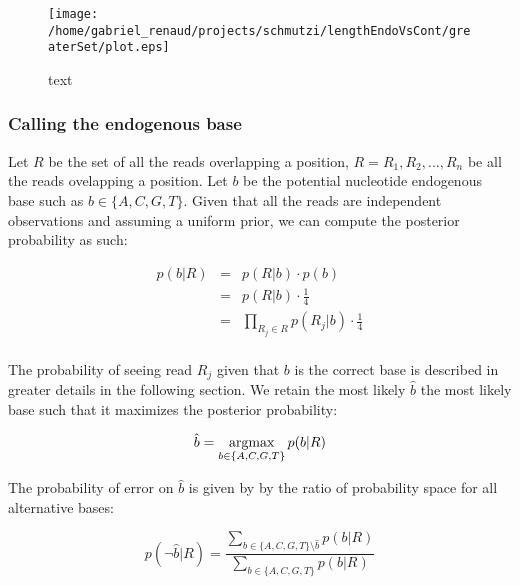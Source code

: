 \documentclass[a4paper,12pt]{article}
\newcommand{\argmax}{\operatornamewithlimits{argmax}}
\begin{document}


\begin{figure}[H]
\centering
\texttt{[image: /home/gabriel\_renaud/projects/schmutzi/lengthEndoVsCont/greaterSet/plot.eps]}
\caption{text}
\end{figure}


















\subsubsection{Calling the endogenous base}


\noindent Let $R$ be the set of all the reads overlapping a position, $R={R_1,R_2,...,R_n}$ be all the reads ovelapping a position.  Let $b$ be the potential nucleotide endogenous base such as $b\in\{A,C,G,T\}$. Given that all the reads are independent observations and assuming a uniform prior, we can compute the posterior probability as such:

\begin{eqnarray}
  p(b|R)   & = & p(R|b) \cdot p(b)  \\
  & = & p(R|b) \cdot \frac {1} {4} \\
  & = & \prod_{R_j \in R} p(R_j|b) \cdot \frac {1} {4} \\
\label{eqn:idenp}
\end{eqnarray} 


\noindent The probability of seeing read $R_j$ given that $b$ is the correct base is described in greater details in the following section.  We retain the most likely $\hat{b}$ the most likely base such that it maximizes the posterior probability:

\begin{equation}
\hat{b} = \argmax_{b \in \{A,C,G,T\} }   p(b|R)
\end{equation} 


\noindent  The probability of error on $\hat{b}$ is given by by the ratio of probability space for all alternative bases:

\begin{equation}
p(\neg \hat{b}|R) = \frac { \sum\limits_{ b \in \{A,C,G,T\}  \setminus \hat{b} } p(b|R) } { \sum\limits_{ b \in \{A,C,G,T\}  } p(b|R) }
\label{errormt}
\end{equation}
 
\end{document}
